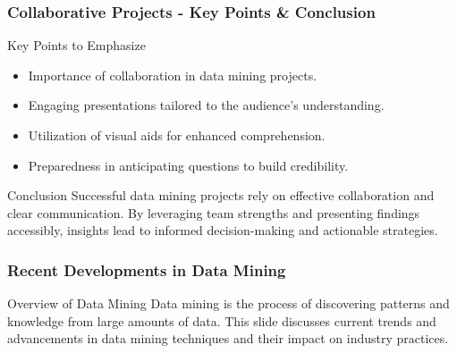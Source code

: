 \documentclass{beamer}
\begin{document}
\begin{frame}[fragile]
    \frametitle{Collaborative Projects - Key Points & Conclusion}

    \begin{block}{Key Points to Emphasize}
        \begin{itemize}
            \item Importance of collaboration in data mining projects.
            \item Engaging presentations tailored to the audience's understanding.
            \item Utilization of visual aids for enhanced comprehension.
            \item Preparedness in anticipating questions to build credibility.
        \end{itemize}
    \end{block}
    
    \begin{block}{Conclusion}
        Successful data mining projects rely on effective collaboration and clear communication. By leveraging team strengths and presenting findings accessibly, insights lead to informed decision-making and actionable strategies.
    \end{block}
\end{frame}

\begin{frame}[fragile]
    \frametitle{Recent Developments in Data Mining}
    
    \begin{block}{Overview of Data Mining}
        Data mining is the process of discovering patterns and knowledge from large amounts of data. 
        This slide discusses current trends and advancements in data mining techniques and their impact on industry practices.
    \end{block}
\end{frame}
\end{document}
